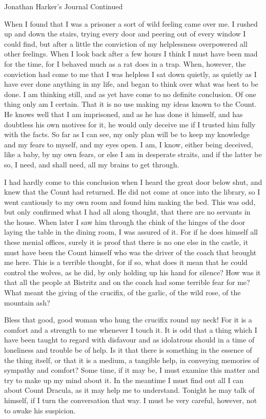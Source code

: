 Jonathan Harker's Journal Continued 

When I found that I was a prisoner a sort of wild feeling came over me. I rushed up and down the stairs, trying every door and peering out of every window I could find, but after a little the conviction of my helplessness overpowered all other feelings. When I look back after a few hours I think I must have been mad for the time, for I behaved much as a rat does in a trap. When, however, the conviction had come to me that I was helpless I sat down quietly, as quietly as I have ever done anything in my life, and began to think over what was best to be done. I am thinking still, and as yet have come to no definite conclusion. Of one thing only am I certain. That it is no use making my ideas known to the Count. He knows well that I am imprisoned, and as he has done it himself, and has doubtless his own motives for it, he would only deceive me if I trusted him fully with the facts. So far as I can see, my only plan will be to keep my knowledge and my fears to myself, and my eyes open. I am, I know, either being deceived, like a baby, by my own fears, or else I am in desperate straits, and if the latter be so, I need, and shall need, all my brains to get through. 

I had hardly come to this conclusion when I heard the great door below shut, and knew that the Count had returned. He did not come at once into the library, so I went cautiously to my own room and found him making the bed. This was odd, but only confirmed what I had all along thought, that there are no servants in the house. When later I saw him through the chink of the hinges of the door laying the table in the dining room, I was assured of it. For if he does himself all these menial offices, surely it is proof that there is no one else in the castle, it must have been the Count himself who was the driver of the coach that brought me here. This is a terrible thought, for if so, what does it mean that he could control the wolves, as he did, by only holding up his hand for silence? How was it that all the people at Bistritz and on the coach had some terrible fear for me? What meant the giving of the crucifix, of the garlic, of the wild rose, of the mountain ash? 

Bless that good, good woman who hung the crucifix round my neck! For it is a comfort and a strength to me whenever I touch it. It is odd that a thing which I have been taught to regard with disfavour and as idolatrous should in a time of loneliness and trouble be of help. Is it that there is something in the essence of the thing itself, or that it is a medium, a tangible help, in conveying memories of sympathy and comfort? Some time, if it may be, I must examine this matter and try to make up my mind about it. In the meantime I must find out all I can about Count Dracula, as it may help me to understand. Tonight he may talk of himself, if I turn the conversation that way. I must be very careful, however, not to awake his suspicion. 

